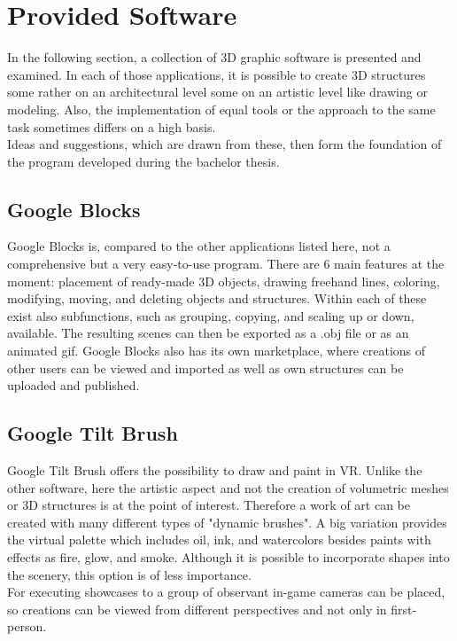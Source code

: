 \documentclass{report}
\begin{document}
	\section{Provided Software} \label{Provided Software}
	\startsection
		In the following section, a collection of 3D graphic software is presented and examined. In each of those applications, it is possible to create 3D structures some rather on an architectural level some on an artistic level like drawing or modeling. Also, the implementation of equal tools or the approach to the same task sometimes differs on a high basis. \\
		Ideas and suggestions, which are drawn from these, then form the foundation of the program developed during the bachelor thesis.
		\subsection[Google Blocks]{Google Blocks \textsc{\small{\cite{GB4}}}}
		\startsubsection
			Google Blocks is, compared to the other applications listed here, not a comprehensive but a very easy-to-use program. There are 6 main features at the moment: placement of ready-made 3D objects, drawing freehand lines, coloring, modifying, moving, and deleting objects and structures. Within each of these exist also subfunctions, such as grouping, copying, and scaling up or down, available. The resulting scenes can then be exported as a .obj file or as an animated gif. Google Blocks also has its own marketplace, where creations of other users can be viewed and imported as well as own structures can be uploaded and published.
		\closesection
		\subsection[Google Tilt Brush]{Google Tilt Brush \textsc{\small{\cite{GTB}}}}
		\startsubsection
			Google Tilt Brush offers the possibility to draw and paint in VR. Unlike the other software, here the artistic aspect and not the creation of volumetric meshes or 3D structures is at the point of interest. Therefore a work of art can be created with many different types of "dynamic brushes". A big variation provides the virtual palette which includes oil, ink, and watercolors besides paints with effects as fire, glow, and smoke. Although it is possible to incorporate shapes into the scenery, this option is of less importance. \\
			For executing showcases to a group of observant in-game cameras can be placed, so creations can be viewed from different perspectives and not only in first-person.
		\closesection
\end{document}

